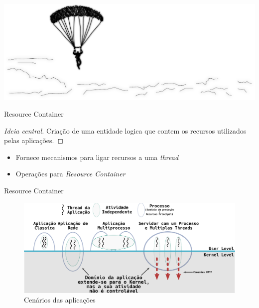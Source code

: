 \documentclass[xcolor={usenames,svgnames,dvipsnames},brazil,english,12pt,aspectratio=149]{beamer}
\begin{document}
\begin{frame}[plain]
  \includegraphics[width=\textwidth]{presentation_cap2_four}
\end{frame}

\begin{frame}{Resource Container}

  \begin{proof}[Ideia central]
Criação de uma entidade logica que contem os recursos utilizados pelas aplicações.
  \end{proof}

    \begin{itemize}
      \item Fornece mecanismos para ligar recursos a uma \emph{thread}
      \item Operações para \emph{Resource Container}
    \end{itemize}

\end{frame}

\begin{frame}{Resource Container}
  \begin{figure}[!h]
    \centering
    \includegraphics[width=\textwidth]{resource_constainer_scenarios} 
    \caption{Cenários das aplicações}
    \label{fig:resource_constainer_scenarios}
  \end{figure}
\end{frame}
\end{document}
